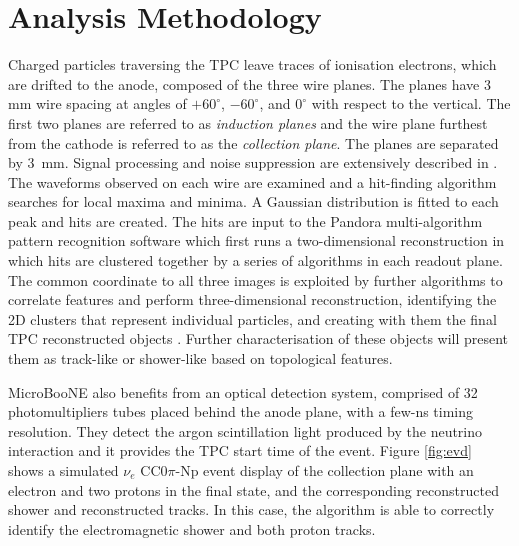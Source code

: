 \section{Analysis Methodology}
\label{sec:methodology}

Charged particles traversing the TPC leave traces of ionisation electrons, which are drifted to the anode, composed of the three wire planes. The planes have 3 mm wire spacing at angles of $+60^{\circ}$, $-60^{\circ}$, and $0^{\circ}$ with respect to the vertical. The first two planes are referred to as \emph{induction planes} and the wire plane furthest from the cathode is referred to as the \emph{collection plane}. The planes are separated by 3~mm. Signal processing and noise suppression are extensively described in \cite{noise}. The waveforms observed on each wire are examined and a hit-finding algorithm searches for local maxima and minima. A Gaussian distribution is fitted to each peak and hits are created. 
The hits are input to the Pandora multi-algorithm pattern recognition software \cite{pandora} which first runs a two-dimensional reconstruction in which hits are clustered together by a series of algorithms in each readout plane. The common coordinate to all three images is exploited by further algorithms to correlate features and perform three-dimensional reconstruction, identifying the 2D clusters that represent individual particles, and creating with them the final TPC reconstructed objects \cite{pandora2}. Further characterisation of these objects will present them as track-like or shower-like based on topological features.

MicroBooNE also benefits from an optical detection system, comprised of 32 photomultipliers tubes placed behind the anode plane, with a few-ns timing resolution. They detect the argon scintillation light produced by the neutrino interaction and it provides the TPC start time of the event.
Figure \ref{fig:evd} shows a simulated $\nu_{e}$ CC0$\pi$-Np event display of the collection plane with an electron and two protons in the final state, and the corresponding reconstructed shower and reconstructed tracks. In this case, the algorithm is able to correctly identify the electromagnetic shower and both proton tracks.

